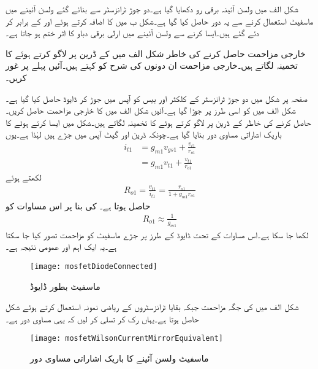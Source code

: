 شکل  الف میں ولسن آئینہ برقی رو دکھایا گیا ہے۔دو جوڑ ٹرانزسٹر سے بنائے گئے ولسن آئینے میں ماسفیٹ استعمال کرنے سے یہ دور حاصل کیا گیا ہے۔شکل  ب میں  کا اضافہ کرتے ہوئے  اور  کے  برابر کر دئے گئے ہیں۔ایسا کرنے سے ولسن آئینے میں ارلی برقی دباو کا اثر ختم ہو جاتا ہے۔

خارجی مزاحمت حاصل کرنے کی خاطر شکل  الف میں  کے ڈرین پر  لاگو کرتے ہوئے  کا تخمینہ لگاتے ہیں۔خارجی مزاحمت  ان دونوں کی شرح کو کہتے ہیں۔آئیں پہلے  پر غور کریں۔

صفحہ  پر شکل  میں دو جوڑ ٹرانزسٹر کے کلکٹر اور بیس کو آپس میں جوڑ کر ڈایوڈ حاصل کیا گیا ہے۔شکل  الف میں  کو اسی طرز پر جوڑا گیا ہے۔آئیں شکل  الف میں  کا خارجی مزاحمت  حاصل کریں۔ حاصل کرنے کی خاطر  کے ڈرین پر  لاگو کرتے ہوئے  کا تخمینہ لگاتے ہیں۔شکل  میں ایسا کرتے ہوئے    کا باریک اشاراتی مساوی دور بنایا گیا ہے۔چونکہ ڈرین اور گیٹ آپس میں جڑے ہیں لہٰذا   ہے۔یوں
\begin{align*}
i_{t1}&=g_{m1} v_{gs1}+\frac{v_{t1}}{r_{o1}}\\
&=g_{m1} v_{t1}+\frac{v_{t1}}{r_{o1}}
\end{align*}
لکھتے ہوئے
\begin{align}
R_{o1}=\frac{v_{t1}}{i_{t1}}=\frac{r_{o1}}{1+g_{m1} r_{o1}}
\end{align}
حاصل ہوتا ہے۔ کی بنا پر اس مساوات کو
\begin{align}
R_{o1} \approx \frac{1}{g_{m1}}
\end{align}
لکھا جا سکا ہے۔اس مساوات کے تحت ڈایوڈ کے طرز پر جڑے ماسفیٹ کو مزاحمت  تصور کیا جا سکتا ہے۔یہ ایک اہم اور عمومی نتیجہ ہے۔ 
\begin{figure}
\centering
\texttt{[image: mosfetDiodeConnected]}
\caption{ماسفیٹ بطور ڈایوڈ}
\label{شکل_تفرقی_ماسفیٹ_بطور_ڈایوڈ}
\end{figure}

شکل  الف میں  کی جگہ مزاحمت  جبکہ بقایا ٹرانزسٹروں کے ریاضی نمونہ استعمال کرتے ہوئے شکل  حاصل ہوتا ہے۔یہاں رک کر تسلی کر لیں کہ یہی مساوی دور ہے۔ 
\begin{figure}
\centering
\texttt{[image: mosfetWilsonCurrentMirrorEquivalent]}
\caption{ماسفیٹ ولسن آئینے کا باریک اشاراتی مساوی دور}
\label{شکل_تفرقی_ماسفیٹ_ولسن_مساوی_دور}
\end{figure}

